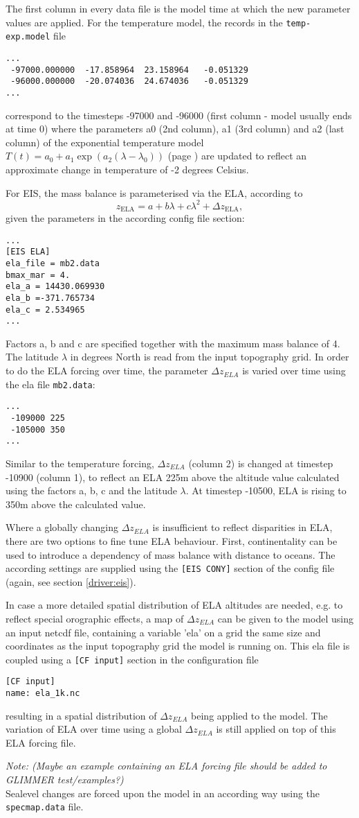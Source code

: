 The first column in every data file is the model time at which the new
parameter values are applied. For the temperature model, the records in the
\texttt{temp-exp.model} file
\begin{verbatim}
...
 -97000.000000  -17.858964  23.158964   -0.051329
 -96000.000000  -20.074036  24.674036   -0.051329
...
\end{verbatim}

correspond to the timesteps -97000 and -96000 (first column - model usually
ends at time 0) where the parameters a0 (2nd column), a1 (3rd column) and a2
(last column) of the exponential temperature model $T(t)=a_0+a_1\exp\left(a_2(\lambda-\lambda_0)\right)$
(page \pageref{driver:eis})
are updated to reflect an approximate change in temperature of -2 degrees
Celsius.

For EIS, the mass balance is parameterised via the ELA, according to
$$z_{\text{ELA}} = a + b\lambda + c\lambda^2 + \Delta z_{\text{ELA}},$$
given the parameters in the according config file section:
\begin{verbatim}
...
[EIS ELA]
ela_file = mb2.data
bmax_mar = 4.
ela_a = 14430.069930
ela_b =-371.765734
ela_c = 2.534965
...
\end{verbatim}
Factors a, b and c are specified together with the maximum mass balance of 4. The
latitude $\lambda$ in degrees North is read from the input topography grid. In
order to do the ELA forcing over time, the parameter $\Delta z_{ELA}$ is varied
over time using the ela file \texttt{mb2.data}:
\begin{verbatim}
...
 -109000 225
 -105000 350
...
\end{verbatim}

Similar to the temperature forcing, $\Delta z_{ELA}$ (column 2) is changed at
timestep -10900 (column 1), to reflect an ELA 225m above the altitude value
calculated using the factors a, b, c and the latitude $\lambda$. At timestep
-10500, ELA is rising to 350m above the calculated value.

Where a globally changing $\Delta z_{ELA}$ is insufficient to reflect
disparities in ELA, there are two options to fine tune ELA behaviour. First,
continentality can be used to introduce a dependency of mass balance with
distance to oceans. The according settings are supplied using the \texttt{[EIS CONY]}
section of the config file (again, see section \ref{driver:eis}).

In case a more detailed spatial distribution of ELA altitudes are needed, e.g. 
to reflect special orographic effects, a map of $\Delta z_{ELA}$ can be given
to the model using an input netcdf file, containing a variable 'ela' on a grid
the same size and coordinates as the input topography grid the model is running
on. This ela file is coupled using a \texttt{[CF input]} section in the
configuration file
\begin{verbatim}
[CF input]
name: ela_1k.nc
\end{verbatim}
resulting in a spatial distribution of $\Delta z_{ELA}$ being applied to the
model. The variation of ELA over time using a global $\Delta z_{ELA}$ is still
applied on top of this ELA forcing file.

\textcolor[rgb]{1.00,0.00,0.00}{\emph{Note: (Maybe an example
containing an ELA forcing file should be added to GLIMMER test/examples?)}}
\\
Sealevel changes are forced upon the model in an according way using the
\texttt{specmap.data} file.
